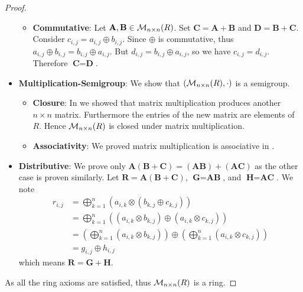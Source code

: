 \begin{proof}
\begin{itemize}
\begin{itemize}
            \item \textbf{Commutative}: Let $\textbf{A}, \textbf{B} \in \mathcal{M}_{n\times n}(R)$. Set $\textbf{C} = \textbf{A} + \textbf{B}$ and $\textbf{D} = \textbf{B} + \textbf{C}$. Consider $c_{i,j} = a_{i,j} \oplus b_{i,j}$. Since $\oplus$ is commutative, thus $a_{i,j} \oplus b_{i,j} = b_{i,j} \oplus a_{i,j}$. But $d_{i,j} = b_{i,j} \oplus a_{i,j}$, so we have $c_{i,j} = d_{i,j}$. Therefore $\textbf{C} = \textbf{D}$.
        \end{itemize}

        \item \textbf{Multiplication-Semigroup}: We show that $(\mathcal{M}_{n\times n}(R), \cdot)$ is a semigroup.
        \begin{itemize}
            \item \textbf{Closure}: In  we showed that matrix multiplication produces another $n \times n$ matrix. Furthermore the entries of the new matrix are elements of $R$. Hence $\mathcal{M}_{n\times n}(R)$ is closed under matrix multiplication.
        
            \item \textbf{Associativity}: We proved matrix multiplication is associative in .
        \end{itemize}
        
        \item \textbf{Distributive}: We prove only $\textbf{A}(\textbf{B} + \textbf{C}) = (\textbf{AB}) + (\textbf{AC})$ as the other case is proven similarly. Let $\textbf{R} = \textbf{A}(\textbf{B} + \textbf{C})$, $\textbf{G} = \textbf{AB}$, and $\textbf{H} = \textbf{AC}$. We note
        \begin{align*}
            r_{i,j} &= \bigoplus_{k=1}^n \left(a_{i,k} \otimes \left(b_{k,j} \oplus c_{k,j}\right)\right)\\
            &= \bigoplus_{k=1}^n \left((a_{i,k} \otimes b_{k,j}) \oplus (a_{i,k} \otimes c_{k,j})\right)\\
            &= \left(\bigoplus_{k=1}^n (a_{i,k} \otimes b_{k,j})\right) \oplus \left(\bigoplus_{k=1}^n (a_{i,k} \otimes c_{k,j})\right)\\
            &= g_{i,j}\oplus h_{i,j}
        \end{align*}
        which means $\textbf{R} = \textbf{G} + \textbf{H}$.
    \end{itemize}
    As all the ring axioms are satisfied, thus $\mathcal{M}_{n\times n}(R)$ is a ring.


\end{proof}
